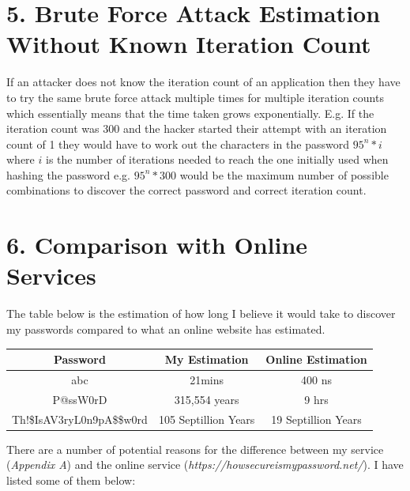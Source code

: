 \documentclass[a4paper, twoside, 11pt]{article}
\begin{document}
\section*{5. Brute Force Attack Estimation Without Known Iteration Count}
If an attacker does not know the iteration count of an application then they have to try the same brute
force attack multiple times for multiple iteration counts which essentially means that the time taken grows exponentially.
E.g. If the iteration count was 300 and the hacker started their attempt with an iteration count of 1 they would have
to work out the characters in the password $95^n*i$ where $i$ is the number of iterations needed to reach the one initially
used when hashing the password e.g. $95^n*300$ would be the maximum number of possible combinations to discover the correct password and correct iteration count.

\section*{6. Comparison with Online Services}
The table below is the estimation of how long I believe it would take to discover my passwords compared to what an online website has estimated.
\begin{center}
	\begin{tabular}{ |c|c|c| } 
	 \hline
	 Password & My Estimation & Online Estimation  \\
	 \hline
	 abc & 21mins & 400 ns \\ 
	 P@ssW0rD & 315,554 years & 9 hrs \\ 
	 Th!\$IsAV3ryL0n9pA\$\$w0rd & 105 Septillion Years & 19 Septillion Years \\ 
	 \hline
	\end{tabular}
\end{center}

There are a number of potential reasons for the difference between my service (\textit{Appendix A})
 and the online service (\textit{https://howsecureismypassword.net/}). I have listed some of them below:
\end{document}
